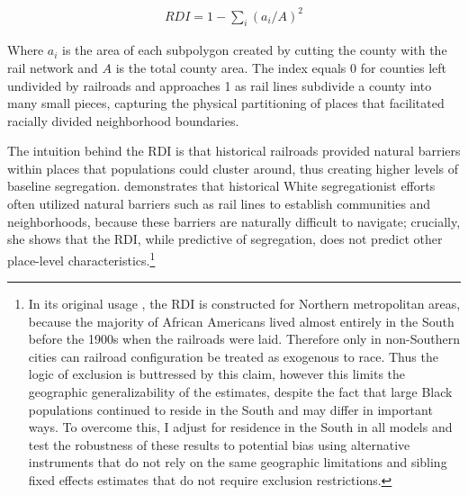 \documentclass[11pt]{article}
\begin{document}
\begin{align} 
RDI = 1 - \sum_i (a_i/A)^2
\end{align}

 Where $a_i$ is the area of each subpolygon created by cutting the county with the rail network and $A$ is the total county area. The index equals 0 for counties left undivided by railroads and approaches 1 as rail lines subdivide a county into many small pieces, capturing the physical partitioning of places that facilitated racially divided neighborhood boundaries.

The intuition behind the RDI is that historical railroads provided natural barriers within places that populations could cluster around, thus creating higher levels of baseline segregation. \citet{ananat_wrong_2011} demonstrates that historical White segregationist efforts often utilized natural barriers such as rail lines to establish communities and neighborhoods, because these barriers are naturally difficult to navigate; crucially, she shows that the RDI, while predictive of segregation, does not predict other place-level characteristics.\footnote{In its original usage \citep{ananat_wrong_2011}, the RDI is constructed for Northern metropolitan areas, because the majority of African Americans lived almost entirely in the South before the 1900s when the railroads were laid. Therefore only in non-Southern cities can railroad configuration be treated as exogenous to race. Thus the logic of exclusion is buttressed by this claim, however this limits the geographic generalizability of the estimates, despite the fact that large Black populations continued to reside in the South and may differ in important ways. To overcome this, I adjust for residence in the South in all models and test the robustness of these results to potential bias using alternative instruments that do not rely on the same geographic limitations and sibling fixed effects estimates that do not require exclusion restrictions.}
\end{document}
